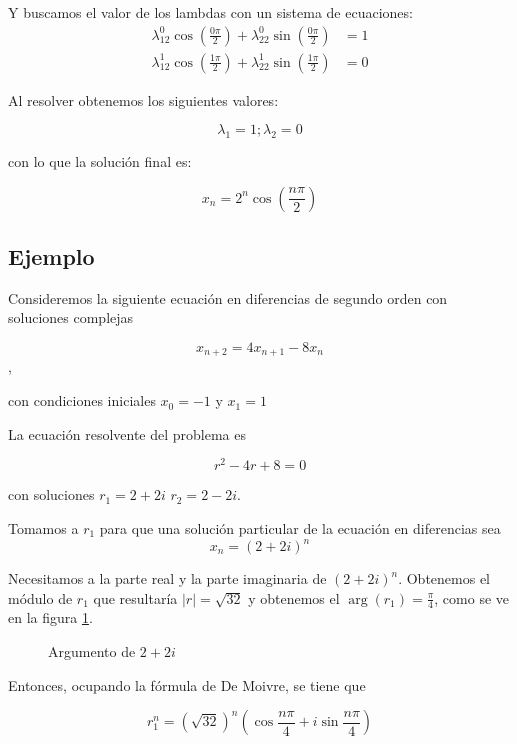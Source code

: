 \documentclass{report}
\begin{document}
Y buscamos el valor de los lambdas con un sistema de ecuaciones:
\begin{align*}
\lambda_12^0\cos(\frac{0\pi}{2})+\lambda_22^0\sin(\frac{0\pi}{2})&=1\\
\lambda_12^1\cos(\frac{1\pi}{2})+\lambda_22^1\sin(\frac{1\pi}{2})&=0
\end{align*}

Al resolver obtenemos los siguientes valores:

$$\lambda_1=1;\lambda_2=0$$

con lo que la solución final es:

$$x_n=2^n\cos(\frac{n\pi}{2})$$
\bigskip
\bigskip
\subsection{Ejemplo}

Consideremos la siguiente ecuación en diferencias de segundo orden con soluciones complejas

$$x_{n+2}=4x_{n+1}-8x_{n}$$,

con condiciones iniciales $x_{0}=-1$ y $x_{1}=1$

 La ecuación resolvente del problema es

 $$r^2-4r+8=0$$

 con soluciones $r_{1}=2+2i$ $r_{2}=2-2i$.

\bigskip

 Tomamos a $r_{1}$ para que una solución particular de la ecuación en diferencias sea $$x_{n}=(2+2i)^n$$

 Necesitamos a la parte real y la parte imaginaria de $(2+2i)^n$. Obtenemos el módulo de $r_{1}$ que resultaría $|r|= \sqrt{32}$ y obtenemos el $\arg(r_{1})=\frac{\pi}{4}$, como se ve en la figura \ref{fig:1}.

 \begin{figure}[htp]
   \centering
   \caption{Argumento de $2+2i$}
   \label{fig:1}
 \end{figure}

Entonces, ocupando la fórmula de De Moivre, se tiene que

$$r_{1}^n=(\sqrt{32})^n(\cos{\frac{n\pi}{4}}+i\sin{\frac{n\pi}{4}})$$
\end{document}

